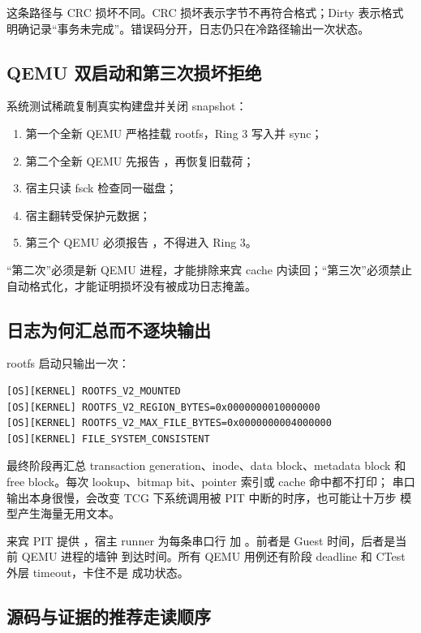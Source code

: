 这条路径与 CRC 损坏不同。CRC 损坏表示字节不再符合格式；Dirty 表示格式
明确记录“事务未完成”。错误码分开，日志仍只在冷路径输出一次状态。

\subsection{QEMU 双启动和第三次损坏拒绝}

系统测试稀疏复制真实构建盘并关闭 snapshot：

\begin{enumerate}
  \item 第一个全新 QEMU 严格挂载 rootfs，Ring 3 写入并 sync；
  \item 第二个全新 QEMU 先报告 ，再恢复旧载荷；
  \item 宿主只读 fsck 检查同一磁盘；
  \item 宿主翻转受保护元数据；
  \item 第三个 QEMU 必须报告 ，不得进入 Ring 3。
\end{enumerate}

“第二次”必须是新 QEMU 进程，才能排除来宾 cache 内读回；“第三次”必须禁止
自动格式化，才能证明损坏没有被成功日志掩盖。

\subsection{日志为何汇总而不逐块输出}

rootfs 启动只输出一次：

\begin{lstlisting}[caption={v1.6 稳定文件系统里程碑}]
[OS][KERNEL] ROOTFS_V2_MOUNTED
[OS][KERNEL] ROOTFS_V2_REGION_BYTES=0x0000000010000000
[OS][KERNEL] ROOTFS_V2_MAX_FILE_BYTES=0x0000000004000000
[OS][KERNEL] FILE_SYSTEM_CONSISTENT
\end{lstlisting}

最终阶段再汇总 transaction generation、inode、data block、metadata block
和 free block。每次 lookup、bitmap bit、pointer 索引或 cache 命中都不打印；
串口输出本身很慢，会改变 TCG 下系统调用被 PIT 中断的时序，也可能让十万步
模型产生海量无用文本。

来宾 PIT 提供 ，宿主 runner 为每条串口行
加 \code{[QEMU][T+...ms]}。前者是 Guest 时间，后者是当前 QEMU 进程的墙钟
到达时间。所有 QEMU 用例还有阶段 deadline 和 CTest 外层 timeout，卡住不是
成功状态。

\subsection{源码与证据的推荐走读顺序}

